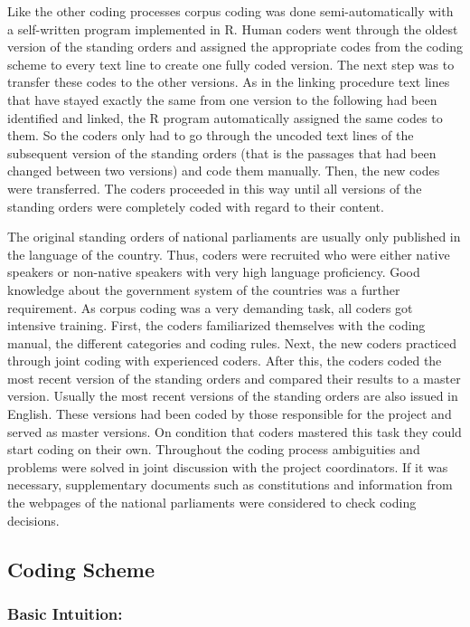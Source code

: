 \documentclass[]{article}
\begin{document}
Like the other coding processes corpus coding was done
semi-automatically with a self-written program implemented in R. Human
coders went through the oldest version of the standing orders and
assigned the appropriate codes from the coding scheme to every text line
to create one fully coded version. The next step was to transfer these
codes to the other versions. As in the linking procedure text lines that
have stayed exactly the same from one version to the following had been
identified and linked, the R program automatically assigned the same
codes to them. So the coders only had to go through the uncoded text
lines of the subsequent version of the standing orders (that is the
passages that had been changed between two versions) and code them
manually. Then, the new codes were transferred. The coders proceeded in
this way until all versions of the standing orders were completely coded
with regard to their content.

The original standing orders of national parliaments are usually only
published in the language of the country. Thus, coders were recruited
who were either native speakers or non-native speakers with very high
language proficiency. Good knowledge about the government system of the
countries was a further requirement. As corpus coding was a very
demanding task, all coders got intensive training. First, the coders
familiarized themselves with the coding manual, the different categories
and coding rules. Next, the new coders practiced through joint coding
with experienced coders. After this, the coders coded the most recent
version of the standing orders and compared their results to a master
version. Usually the most recent versions of the standing orders are
also issued in English. These versions had been coded by those
responsible for the project and served as master versions. On condition
that coders mastered this task they could start coding on their own.
Throughout the coding process ambiguities and problems were solved in
joint discussion with the project coordinators. If it was necessary,
supplementary documents such as constitutions and information from the
webpages of the national parliaments were considered to check coding
decisions.

\subsection{Coding Scheme}\label{coding-scheme}

\subsubsection{Basic Intuition:}\label{basic-intuition}
\end{document}
